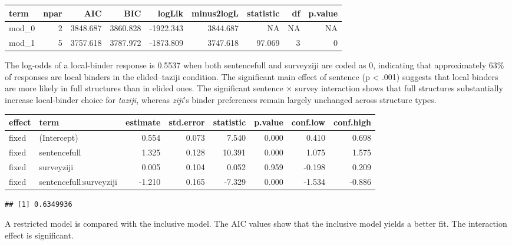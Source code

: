\documentclass[
  man]{apa6}
\begin{document}
\begin{tabular}{l|r|r|r|r|r|r|r|r}
\hline
term & npar & AIC & BIC & logLik & minus2logL & statistic & df & p.value\\
\hline
mod\_0 & 2 & 3848.687 & 3860.828 & -1922.343 & 3844.687 & NA & NA & NA\\
\hline
mod\_1 & 5 & 3757.618 & 3787.972 & -1873.809 & 3747.618 & 97.069 & 3 & 0\\
\hline
\end{tabular}

The log-odds of a local-binder response is 0.5537 when both sentencefull and surveyziji are coded as 0, indicating that approximately 63\% of responses are local binders in the elided--taziji condition. The significant main effect of sentence (p \textless{} .001) suggests that local binders are more likely in full structures than in elided ones. The significant sentence × survey interaction shows that full structures substantially increase local-binder choice for \emph{taziji}, whereas \emph{ziji}'s binder preferences remain largely unchanged across structure types.

\begin{tabular}{l|l|r|r|r|r|r|r}
\hline
effect & term & estimate & std.error & statistic & p.value & conf.low & conf.high\\
\hline
fixed & (Intercept) & 0.554 & 0.073 & 7.540 & 0.000 & 0.410 & 0.698\\
\hline
fixed & sentencefull & 1.325 & 0.128 & 10.391 & 0.000 & 1.075 & 1.575\\
\hline
fixed & surveyziji & 0.005 & 0.104 & 0.052 & 0.959 & -0.198 & 0.209\\
\hline
fixed & sentencefull:surveyziji & -1.210 & 0.165 & -7.329 & 0.000 & -1.534 & -0.886\\
\hline
\end{tabular}

\begin{verbatim}
## [1] 0.6349936
\end{verbatim}

A restricted model is compared with the inclusive model. The AIC values show that the inclusive model yields a better fit. The interaction effect is significant.
\end{document}
